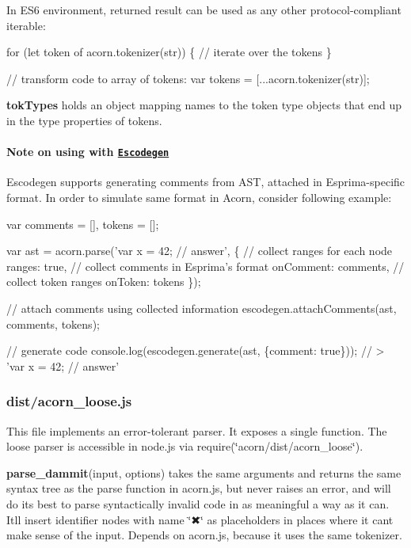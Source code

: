 In E\+S6 environment, returned result can be used as any other protocol-\/compliant iterable\+:


\begin{DoxyCode}
for (let token of acorn.tokenizer(str)) \{
  // iterate over the tokens
\}

// transform code to array of tokens:
var tokens = [...acorn.tokenizer(str)];
\end{DoxyCode}


{\bfseries tok\+Types} holds an object mapping names to the token type objects that end up in the {\ttfamily type} properties of tokens.

\paragraph*{Note on using with \href{https://github.com/estools/escodegen}{\tt Escodegen}}

Escodegen supports generating comments from A\+ST, attached in Esprima-\/specific format. In order to simulate same format in Acorn, consider following example\+:


\begin{DoxyCode}
var comments = [], tokens = [];

var ast = acorn.parse('var x = 42; // answer', \{
    // collect ranges for each node
    ranges: true,
    // collect comments in Esprima's format
    onComment: comments,
    // collect token ranges
    onToken: tokens
\});

// attach comments using collected information
escodegen.attachComments(ast, comments, tokens);

// generate code
console.log(escodegen.generate(ast, \{comment: true\}));
// > 'var x = 42;    // answer'
\end{DoxyCode}


\subsubsection*{dist/acorn\+\_\+loose.\+js}

This file implements an error-\/tolerant parser. It exposes a single function. The loose parser is accessible in node.\+js via {\ttfamily require(\char`\"{}acorn/dist/acorn\+\_\+loose\char`\"{})}.

{\bfseries parse\+\_\+dammit}{\ttfamily (input, options)} takes the same arguments and returns the same syntax tree as the {\ttfamily parse} function in {\ttfamily acorn.\+js}, but never raises an error, and will do its best to parse syntactically invalid code in as meaningful a way as it can. It\textquotesingle{}ll insert identifier nodes with name {\ttfamily \char`\"{}✖\char`\"{}} as placeholders in places where it can\textquotesingle{}t make sense of the input. Depends on {\ttfamily acorn.\+js}, because it uses the same tokenizer.

